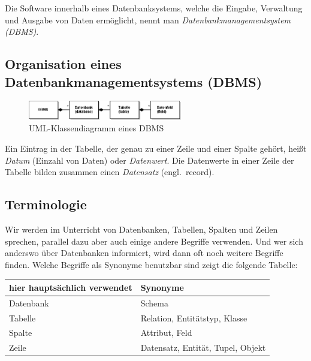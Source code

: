 Die Software innerhalb eines Datenbanksystems, welche die Eingabe, Verwaltung
und Ausgabe von Daten ermöglicht, nennt man \emph{Datenbankmanagementsystem
(DBMS)}.

\subsection{Organisation eines Datenbankmanagementsystems (DBMS)}

\begin{figure}[h]
  \centering
   \includegraphics[width=0.60\textwidth]{./inf/SEKII/32_SQL_Einfuehrung/DBMS}
   \caption{UML-Klassendiagramm eines DBMS}
   \label{fig:dbms}
\end{figure}

Ein Eintrag in der Tabelle, der genau zu einer Zeile und einer Spalte gehört,
heißt \textit{Datum} (Einzahl von Daten) oder \emph{Datenwert}. Die Datenwerte
in einer Zeile der Tabelle bilden zusammen einen \emph{Datensatz} (engl.\
record).

\subsection{Terminologie}

Wir werden im Unterricht von Datenbanken, Tabellen, Spalten und Zeilen sprechen,
parallel dazu aber auch einige andere Begriffe verwenden. Und wer sich anderswo
über Datenbanken informiert, wird dann oft noch weitere Begriffe finden. Welche
Begriffe als Synonyme benutzbar sind zeigt die folgende Tabelle:

\begin{center}
\bgroup
\def\arraystretch{1.2}
\begin{tabularx}{0.75\textwidth}{|X|p{60mm}|}\hline
\textbf{hier hauptsächlich verwendet} & \textbf{Synonyme} \\ \hline 
Datenbank & Schema \\ \hline 
Tabelle & Relation, Entitätstyp, Klasse \\ \hline 
Spalte & Attribut, Feld \\ \hline
Zeile & Datensatz, Entität, Tupel, Objekt \\ \hline
\end{tabularx}
\egroup
\end{center}

